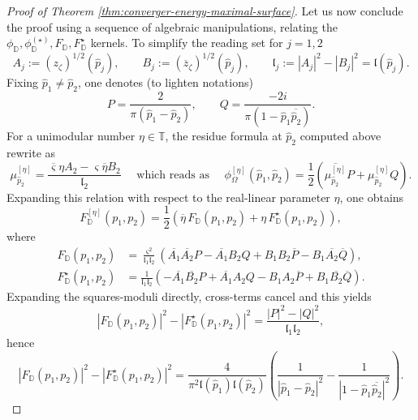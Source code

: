 \documentclass[reqno]{amsart}
\numberwithin{equation}{section}
\theoremstyle{definition}
\theoremstyle{remark}
\begin{document}
\begin{proof}[Proof of Theorem \ref{thm:converger-energy-maximal-surface}]
Let us now conclude the proof using a sequence of algebraic manipulations, relating the $\phi_{\mathbb{D}},\phi_{\mathbb{D}}^{(\star)},F_{\mathbb{D}},F_{\mathbb{D}}^\star $ kernels. To simplify the reading set for $j=1,2$
\begin{equation*}
        A_j:=(z_\zeta)^{1/2}(\hat{p}_j),\qquad
        B_j:=(\overline z_\zeta)^{1/2}(\hat{p}_j),
        \qquad
        \mathfrak l_j:=|A_j|^2-|B_j|^2=\mathfrak l(\hat p_j).\end{equation*}
Fixing $\hat{p}_1\neq \hat{p}_2$, one denotes (to lighten notations)
\begin{equation*}
P=\frac{2}{\pi(\hat{p}_1-\hat{p}_2)},\qquad Q=\frac{-2i}{\pi(1-\hat{p}_1\overline{\hat{p}_2})} .
\end{equation*}
For a unimodular number $\eta \in \mathbb{T}$, the residue formula at  $\hat{p}_2 $ computed above rewrite as
\begin{equation*}
\mu_{\hat p_2}^{[\eta]} =\frac{ \overline{\varsigma}\eta A_2
        -\varsigma\overline{\eta}B_2}{\mathfrak l_2} \quad \textrm{ which reads as } \quad  \phi^{[\eta]}_{\Omega}(\hat p_1,\hat p_2) =\frac12 \left(
  \overline{\mu_{\hat p_2}^{[\eta]}}P+ \mu_{\hat p_2}^{[\eta]}Q
        \right).
\end{equation*}
Expanding this relation with respect to the real-linear parameter $\eta$, one obtains
\begin{equation*}
F_{\mathbb D}^{[\eta]}(p_1,p_2) = \frac12 \left(
\overline{\eta}\,F_{\mathbb D}(p_1,p_2) +\eta\,F^\star_{\mathbb D}(p_1,p_2) \right),
\end{equation*}
where
\[
\begin{aligned}
        F_{\mathbb D}(p_1,p_2)
        &=
        \frac{\varsigma^2}{\mathfrak l_1\mathfrak l_2}
        \left(
        \overline{A_1}\overline{A_2}P
        -
        \overline{A_1}B_2Q
        +
        B_1B_2\overline P
        -
        B_1\overline{A_2}\overline Q
        \right),\\
        F^\star_{\mathbb D}(p_1,p_2)
        &=
        \frac{1}{\mathfrak l_1\mathfrak l_2}
        \left(
        -\overline{A_1}\overline{B_2}P
        +
        \overline{A_1}A_2Q
        -
        B_1A_2\overline P
        +
        B_1\overline{B_2}\overline Q
        \right).
\end{aligned}
\]
Expanding the squares-moduli directly, cross-terms cancel and this yields
\[
        |F_{\mathbb D}(p_1,p_2)|^2
        -
        |F^\star_{\mathbb D}(p_1,p_2)|^2
        =
        \frac{|P|^2-|Q|^2}{\mathfrak l_1\mathfrak l_2},
\]
hence
\[
        |F_{\mathbb D}(p_1,p_2)|^2
        -
        |F^\star_{\mathbb D}(p_1,p_2)|^2
        =
        \frac{4}{\pi^2 \mathfrak l(\hat p_1)\mathfrak l(\hat p_2)}
        \left(
        \frac{1}{|\hat p_1-\hat p_2|^2}
        -
        \frac{1}{|1-\hat p_1\overline{\hat p_2}|^2}
        \right).
\]


\end{proof}
\end{document}
